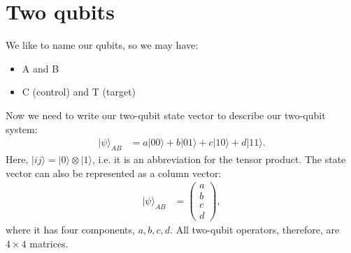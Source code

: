 \documentclass[a4paper, 11pt, normalem]{report}
\begin{document}
\section{Two qubits}
We like to name our qubits, so we may have:
\begin{itemize}
    \item A and B
    \item C (control) and T (target)
\end{itemize}
Now we need to write our two-qubit state vector to describe our two-qubit system:
\begin{align}
    |\psi\rangle_{AB} &= a|00\rangle + b|01\rangle + c|10\rangle + d|11\rangle.
\end{align}
Here, $|ij\rangle=|0\rangle\otimes|1\rangle$, i.e. it is an abbreviation for the tensor product.
The state vector can also be represented as a column vector:
\begin{align}
    |\psi\rangle_{AB} &= \begin{pmatrix} a \\ b \\ c \\ d\end{pmatrix},
\end{align}
where it has four components, $a,b,c,d$.
All two-qubit operators, therefore, are $4\times4$ matrices.
\end{document}
